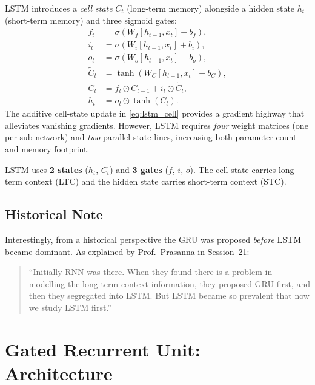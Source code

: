 \documentclass[12pt,a4paper]{article}
\begin{document}
LSTM introduces a \emph{cell state} $C_t$ (long-term memory) alongside a hidden state $h_t$
(short-term memory) and three sigmoid gates:
\begin{align}
  f_t &= \sigma(W_f [h_{t-1}, x_t] + b_f), \label{eq:lstm_forget}\\
  i_t &= \sigma(W_i [h_{t-1}, x_t] + b_i), \label{eq:lstm_input}\\
  o_t &= \sigma(W_o [h_{t-1}, x_t] + b_o), \label{eq:lstm_output}\\
  \tilde{C}_t &= \tanh(W_C [h_{t-1}, x_t] + b_C), \label{eq:lstm_candidate}\\
  C_t &= f_t \odot C_{t-1} + i_t \odot \tilde{C}_t, \label{eq:lstm_cell}\\
  h_t &= o_t \odot \tanh(C_t). \label{eq:lstm_hidden}
\end{align}
The additive cell-state update in \cref{eq:lstm_cell} provides a gradient highway that alleviates
vanishing gradients. However, LSTM requires \emph{four} weight matrices (one per sub-network) and
\emph{two} parallel state lines, increasing both parameter count and memory footprint.

\begin{keyinsight}[title=LSTM State Summary]
LSTM uses \textbf{2 states} ($h_t$, $C_t$) and \textbf{3 gates} ($f$, $i$, $o$).
The cell state carries long-term context (LTC) and the hidden state carries short-term context (STC).
\end{keyinsight}

\subsection{Historical Note}

Interestingly, from a historical perspective the GRU was proposed \emph{before} LSTM became dominant.
As explained by Prof.\ Prasanna in Session~21:

\begin{quote}
``Initially RNN was there. When they found there is a problem in modelling the long-term context
information, they proposed GRU first, and then they segregated into LSTM. But LSTM became so prevalent
that now we study LSTM first.''
\end{quote}

\section{Gated Recurrent Unit: Architecture}
\label{sec:gru_arch}
\end{document}

